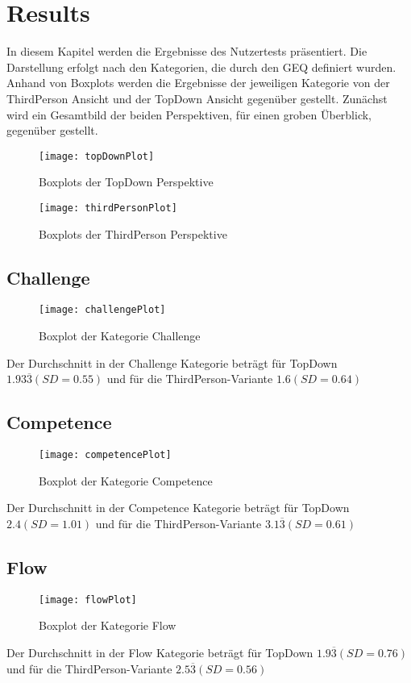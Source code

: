\chapter{Results} %
In diesem Kapitel werden die Ergebnisse des Nutzertests präsentiert. Die Darstellung erfolgt nach den Kategorien, die durch den GEQ definiert wurden. Anhand von Boxplots werden die Ergebnisse der jeweiligen Kategorie von der ThirdPerson Ansicht und der TopDown Ansicht gegenüber gestellt.
Zunächst wird ein Gesamtbild der beiden Perspektiven, für einen groben Überblick, gegenüber gestellt.
\begin{figure}[h!tb]
	\centering
	\texttt{[image: topDownPlot]}
	\caption{Boxplots der TopDown Perspektive\label{fig:topdownbox}}
\end{figure}
\begin{figure}[h!tb]
	\centering
	\texttt{[image: thirdPersonPlot]}
	\caption{Boxplots der ThirdPerson Perspektive\label{fig:thirdpersonbox}}
\end{figure}


\section{Challenge}
\begin{figure}[h!tb]
	\centering
	\texttt{[image: challengePlot]}
	\caption{Boxplot der Kategorie Challenge\label{fig:challengebox}}
\end{figure}
Der Durchschnitt in der Challenge Kategorie beträgt für TopDown  $1.93\overline{3}(SD = 0.55)$ und für die ThirdPerson-Variante $1.6(SD =0.64 )$
\section{Competence}
\begin{figure}[h!tb]
	\centering
	\texttt{[image: competencePlot]}
	\caption{Boxplot der Kategorie Competence\label{fig:competencebox}}
\end{figure}
Der Durchschnitt in der Competence Kategorie beträgt für TopDown  $2.4(SD = 1.01)$ und für die ThirdPerson-Variante $3.1\overline{3}(SD =0.61 )$
\section{Flow}
\begin{figure}[h!tb]
	\centering
	\texttt{[image: flowPlot]}
	\caption{Boxplot der Kategorie Flow\label{fig:flowbox}}
\end{figure}
Der Durchschnitt in der Flow Kategorie beträgt für TopDown  $1.9\overline{3}(SD = 0.76)$ und für die ThirdPerson-Variante $2.5\overline{3}(SD =0.56 )$
